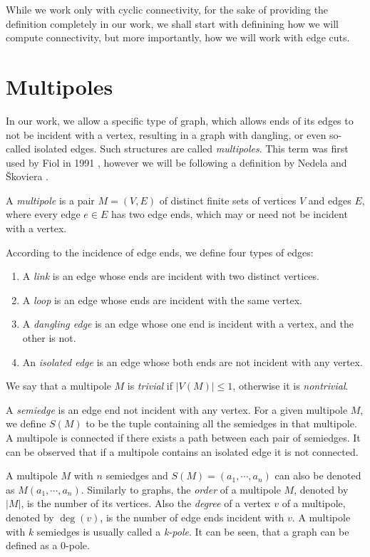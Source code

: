 \documentclass[12pt, twoside]{book}
\begin{document}
While we work only with cyclic connectivity, for the sake of providing the definition completely in our work, we shall start with definining how we will compute connectivity, but more importantly, how we will work with edge cuts.

\section{Multipoles}\label{sec:multipoles}

In our work, we allow a specific type of graph, which allows ends of its edges to not be incident with a vertex, resulting in a graph with dangling, or even so-called isolated edges. Such structures are called \textit{multipoles}. This term was first used by Fiol in 1991 \cite{Fiol1991}, however we will be following a definition by Nedela and Škoviera \cite{Nedela1996}.

\begin{definition}
	A \textit{multipole} is a pair $M=(V,E)$ of distinct finite sets of vertices $V$ and edges $E$, where every edge $e\in E$ has two edge ends, which may or need not be incident with a vertex.
	
	According to the incidence of edge ends, we define four types of edges:
	\begin{enumerate}[nolistsep]
		\item A \textit{link} is an edge whose ends are incident with two distinct vertices.
		\item A \textit{loop} is an edge whose ends are incident with the same vertex.
		\item A \textit{dangling edge} is an edge whose one end is incident with a vertex, and the other is not.
		\item An \textit{isolated edge} is an edge whose both ends are not incident with any vertex.
	\end{enumerate}
\end{definition}

We say that a multipole $M$ is \textit{trivial} if $|V(M)|\leq 1$, otherwise it is \textit{nontrivial}.

A \textit{semiedge} is an edge end not incident with any vertex. For a given multipole $M$, we define $S(M)$ to be the tuple containing all the semiedges in that multipole. A multipole is connected if there exists a path between each pair of semiedges. It can be observed that if a multipole contains an isolated edge it is not connected.

A multipole $M$ with $n$ semiedges and $S(M) = (a_1, \cdots, a_n)$ can also be denoted as $M(a_1,\cdots,a_n)$. Similarly to graphs, the \textit{order} of a multipole $M$, denoted by $|M|$, is the number of its vertices. Also the \textit{degree} of a vertex $v$ of a multipole, denoted by $\deg(v)$, is the number of edge ends incident with $v$. A multipole with $k$ semiedges is usually called a \textit{k-pole}. It can be seen, that a graph can be defined as a 0-pole.
\end{document}
